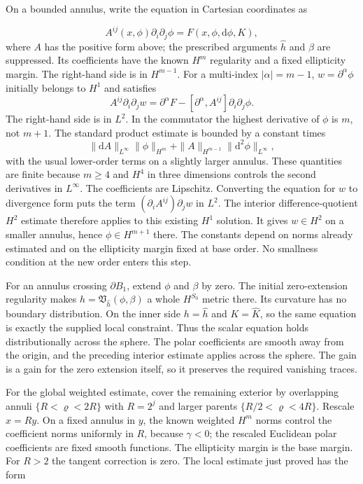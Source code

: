 \documentclass[
  english,
  11pt,
  reqno]{amsart}
\begin{document}
On a bounded annulus, write the equation in Cartesian coordinates as

\label{eq:online-extension-scalar-local-coordinate-equation}
\[
A^{ij}(x,\phi)\partial_i\partial_j\phi
=F(x,\phi,\mathrm d\phi,K),
\] where \(A\) has the positive form above; the prescribed arguments
\(\widehat h\) and \(\beta\) are suppressed. Its coefficients have the
known \(H^m\) regularity and a fixed ellipticity margin. The right-hand
side is in \(H^{m-1}\). For a multi-index \(|\alpha|=m-1\),
\(w=\partial^\alpha\phi\) initially belongs to \(H^1\) and satisfies \[
A^{ij}\partial_i\partial_jw
=\partial^\alpha F-
[\partial^\alpha,A^{ij}]\partial_i\partial_j\phi.
\] The right-hand side is in \(L^2\). In the commutator the highest
derivative of \(\phi\) is \(m\), not \(m+1\). The standard product
estimate is bounded by a constant times \[
\|\mathrm dA\|_{L^\infty}\|\phi\|_{H^m}
+\|A\|_{H^{m-1}}\|\mathrm d^2\phi\|_{L^\infty},
\] with the usual lower-order terms on a slightly larger annulus. These
quantities are finite because \(m\ge4\) and \(H^4\) in three dimensions
controls the second derivatives in \(L^\infty\). The coefficients are
Lipschitz. Converting the equation for \(w\) to divergence form puts the
term \((\partial_iA^{ij})\partial_jw\) in \(L^2\). The interior
difference-quotient \(H^2\) estimate therefore applies to this existing
\(H^1\) solution. It gives \(w\in H^2\) on a smaller annulus, hence
\(\phi\in H^{m+1}\) there. The constants depend on norms already
estimated and on the ellipticity margin fixed at base order. No
smallness condition at the new order enters this step.

For an annulus crossing \(\partial B_1\), extend \(\phi\) and \(\beta\)
by zero. The initial zero-extension regularity makes
\(h=\mathfrak V_{\widehat h}(\phi,\beta)\) a whole \(H^{S_0}\) metric
there. Its curvature has no boundary distribution. On the inner side
\(h=\widehat h\) and \(K=\widehat K\), so the same equation is exactly
the supplied local constraint. Thus the scalar equation holds
distributionally across the sphere. The polar coefficients are smooth
away from the origin, and the preceding interior estimate applies across
the sphere. The gain is a gain for the zero extension itself, so it
preserves the required vanishing traces.

For the global weighted estimate, cover the remaining exterior by
overlapping annuli \(\{R<\varrho<2R\}\) with \(R=2^j\) and larger
parents \(\{R/2<\varrho<4R\}\). Rescale \(x=Ry\). On a fixed annulus in
\(y\), the known weighted \(H^m\) norms control the coefficient norms
uniformly in \(R\), because \(\gamma<0\); the rescaled Euclidean polar
coefficients are fixed smooth functions. The ellipticity margin is the
base margin. For \(R>2\) the tangent correction is zero. The local
estimate just proved has the form
\end{document}
